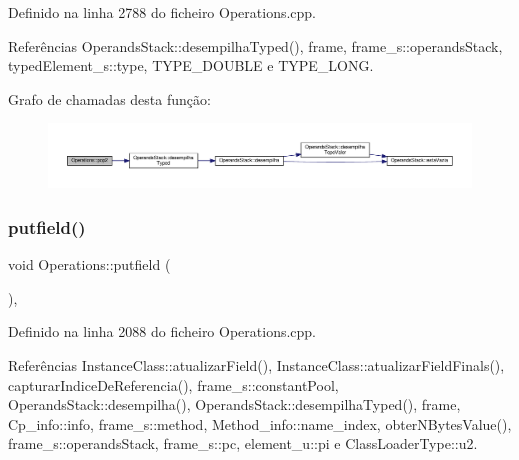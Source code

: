 Definido na linha 2788 do ficheiro Operations.\+cpp.



Referências Operands\+Stack\+::desempilha\+Typed(), frame, frame\+\_\+s\+::operands\+Stack, typed\+Element\+\_\+s\+::type, T\+Y\+P\+E\+\_\+\+D\+O\+U\+B\+LE e T\+Y\+P\+E\+\_\+\+L\+O\+NG.

Grafo de chamadas desta função\+:
\nopagebreak
\begin{figure}[H]
\begin{center}
\leavevmode
\includegraphics[width=350pt]{classOperations_a54e578f7f27df39f8c516ec93195e219_cgraph}
\end{center}
\end{figure}
\mbox{\label{classOperations_a56385f246d3d4d5c5674c988a1f0e658}} 
\subsubsection{\texorpdfstring{putfield()}{putfield()}}
{\footnotesize\ttfamily void Operations\+::putfield (\begin{DoxyParamCaption}{ }\end{DoxyParamCaption})\hspace{0.3cm}{\ttfamily [static]}, {\ttfamily [private]}}



Definido na linha 2088 do ficheiro Operations.\+cpp.



Referências Instance\+Class\+::atualizar\+Field(), Instance\+Class\+::atualizar\+Field\+Finals(), capturar\+Indice\+De\+Referencia(), frame\+\_\+s\+::constant\+Pool, Operands\+Stack\+::desempilha(), Operands\+Stack\+::desempilha\+Typed(), frame, Cp\+\_\+info\+::info, frame\+\_\+s\+::method, Method\+\_\+info\+::name\+\_\+index, obter\+N\+Bytes\+Value(), frame\+\_\+s\+::operands\+Stack, frame\+\_\+s\+::pc, element\+\_\+u\+::pi e Class\+Loader\+Type\+::u2.


